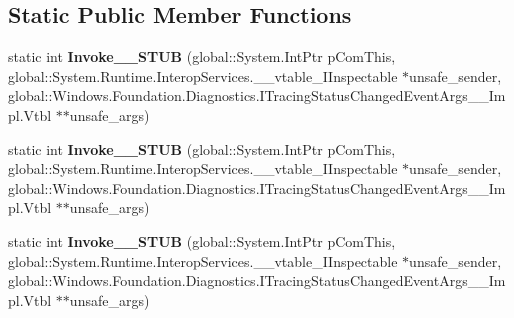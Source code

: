 \subsection*{Static Public Member Functions}
\begin{DoxyCompactItemize}
\item 
\mbox{\label{struct_system_1_1_event_handler___a___windows___foundation___diagnostics___tracing_status_changedfe64b3ab054bcd8e33973c4cffad16b_ab7ca0ac85a8b36e1ed230e0dfa413db3}} 
static int {\bfseries Invoke\+\_\+\+\_\+\+S\+T\+UB} (global\+::\+System.\+Int\+Ptr p\+Com\+This, global\+::\+System.\+Runtime.\+Interop\+Services.\+\_\+\+\_\+vtable\+\_\+\+I\+Inspectable $\ast$unsafe\+\_\+sender, global\+::\+Windows.\+Foundation.\+Diagnostics.\+I\+Tracing\+Status\+Changed\+Event\+Args\+\_\+\+\_\+\+Impl.\+Vtbl $\ast$$\ast$unsafe\+\_\+args)
\item 
\mbox{\label{struct_system_1_1_event_handler___a___windows___foundation___diagnostics___tracing_status_changedfe64b3ab054bcd8e33973c4cffad16b_ab7ca0ac85a8b36e1ed230e0dfa413db3}} 
static int {\bfseries Invoke\+\_\+\+\_\+\+S\+T\+UB} (global\+::\+System.\+Int\+Ptr p\+Com\+This, global\+::\+System.\+Runtime.\+Interop\+Services.\+\_\+\+\_\+vtable\+\_\+\+I\+Inspectable $\ast$unsafe\+\_\+sender, global\+::\+Windows.\+Foundation.\+Diagnostics.\+I\+Tracing\+Status\+Changed\+Event\+Args\+\_\+\+\_\+\+Impl.\+Vtbl $\ast$$\ast$unsafe\+\_\+args)
\item 
\mbox{\label{struct_system_1_1_event_handler___a___windows___foundation___diagnostics___tracing_status_changedfe64b3ab054bcd8e33973c4cffad16b_ab7ca0ac85a8b36e1ed230e0dfa413db3}} 
static int {\bfseries Invoke\+\_\+\+\_\+\+S\+T\+UB} (global\+::\+System.\+Int\+Ptr p\+Com\+This, global\+::\+System.\+Runtime.\+Interop\+Services.\+\_\+\+\_\+vtable\+\_\+\+I\+Inspectable $\ast$unsafe\+\_\+sender, global\+::\+Windows.\+Foundation.\+Diagnostics.\+I\+Tracing\+Status\+Changed\+Event\+Args\+\_\+\+\_\+\+Impl.\+Vtbl $\ast$$\ast$unsafe\+\_\+args)
\item 
\mbox{\label{struct_system_1_1_event_handler___a___windows___foundation___diagnostics___tracing_status_changedfe64b3ab054bcd8e33973c4cffad16b_ab7ca0ac85a8b36e1ed230e0dfa413db3}} 
$$
\end{DoxyCompactItemize}
